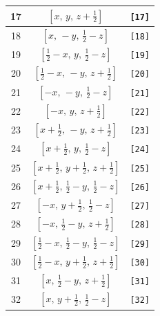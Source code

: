 \documentclass[fleqn,8pt]{jsarticle}
\begin{document}
\begin{longtable}{ccc}
17 & $\left[ x,\, y,\, z + \frac{1}{2} \right]$ & {\tt [17]} \\ \hline
18 & $\left[ x,\, - y,\, \frac{1}{2} - z \right]$ & {\tt [18]} \\ \hline
19 & $\left[ \frac{1}{2} - x,\, y,\, \frac{1}{2} - z \right]$ & {\tt [19]} \\ \hline
20 & $\left[ \frac{1}{2} - x,\, - y,\, z + \frac{1}{2} \right]$ & {\tt [20]} \\ \hline
21 & $\left[ - x,\, - y,\, \frac{1}{2} - z \right]$ & {\tt [21]} \\ \hline
22 & $\left[ - x,\, y,\, z + \frac{1}{2} \right]$ & {\tt [22]} \\ \hline
23 & $\left[ x + \frac{1}{2},\, - y,\, z + \frac{1}{2} \right]$ & {\tt [23]} \\ \hline
24 & $\left[ x + \frac{1}{2},\, y,\, \frac{1}{2} - z \right]$ & {\tt [24]} \\ \hline
25 & $\left[ x + \frac{1}{2},\, y + \frac{1}{2},\, z + \frac{1}{2} \right]$ & {\tt [25]} \\ \hline
26 & $\left[ x + \frac{1}{2},\, \frac{1}{2} - y,\, \frac{1}{2} - z \right]$ & {\tt [26]} \\ \hline
27 & $\left[ - x,\, y + \frac{1}{2},\, \frac{1}{2} - z \right]$ & {\tt [27]} \\ \hline
28 & $\left[ - x,\, \frac{1}{2} - y,\, z + \frac{1}{2} \right]$ & {\tt [28]} \\ \hline
29 & $\left[ \frac{1}{2} - x,\, \frac{1}{2} - y,\, \frac{1}{2} - z \right]$ & {\tt [29]} \\ \hline
30 & $\left[ \frac{1}{2} - x,\, y + \frac{1}{2},\, z + \frac{1}{2} \right]$ & {\tt [30]} \\ \hline
31 & $\left[ x,\, \frac{1}{2} - y,\, z + \frac{1}{2} \right]$ & {\tt [31]} \\ \hline
32 & $\left[ x,\, y + \frac{1}{2},\, \frac{1}{2} - z \right]$ & {\tt [32]} \\
\end{longtable}
\end{document}
